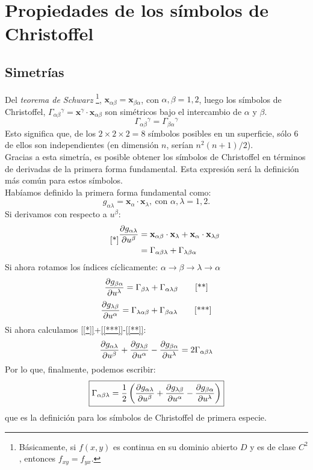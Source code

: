 \section{Propiedades de los símbolos de Christoffel}
\subsection{Simetrías}
Del \emph{teorema de Schwarz} \footnote{Básicamente, si $f(x,y)$ es continua en su dominio abierto $D$ y es de clase $C^2$, entonces $f_{xy}=f_{yx}$.}, $\mathbf{x}_{\alpha \beta }=\mathbf{x}_{\beta \alpha }$, con $\alpha ,\beta =1,2$, luego los símbolos de Christoffel, $\Gamma _{\alpha \beta }{}^\gamma =\mathbf{x}^\gamma \cdot \mathbf{x}_{\alpha \beta }$ son simétricos bajo el intercambio de $\alpha $ y $\beta $.
$$
\Gamma _{\alpha \beta }{}^\gamma =\Gamma _{\beta \alpha  }{}^\gamma 
$$
Esto significa que, de los $2\times 2\times 2=8$ símbolos posibles en un superficie, sólo 6 de ellos son independientes (en dimensión $n$, serían $n^2(n+1)/2$).\\

Gracias a esta simetría, es posible obtener los símbolos de Christoffel en términos de derivadas de la primera forma fundamental. Esta expresión será la definición más común para estos símbolos. \\

Habíamos definido la primera forma fundamental como:
$$
g_{\alpha \lambda }=\mathbf{x}_\alpha \cdot \mathbf{x}_\lambda ,\ \text{con }\alpha ,\lambda=1,2.
$$
Si derivamos con respecto a $u^\beta $:
\begin{equation} \label{[*]}\tag*{[*]}
    \begin{split}
        \pdv{g_{\alpha \lambda  }}{u^\beta }&=\mathbf{x}_{\alpha \beta }\cdot \mathbf{x}_\lambda +\mathbf{x}_\alpha \cdot \mathbf{x}_{\lambda \beta }\\
        &=\Gamma_{\alpha \beta \lambda }+\Gamma _{\lambda \beta \alpha }
    \end{split}
\end{equation}
Si ahora rotamos los índices cíclicamente: $\alpha \rightarrow \beta \rightarrow \lambda \rightarrow \alpha $
\begin{equation} \label{[**]}
    \pdv{g_{\beta \alpha }}{u^\lambda }=\Gamma _{\beta \lambda }+\Gamma _{\alpha \lambda \beta } \tag*{[**]}
\end{equation}
\begin{equation}\label{[***]}
    \pdv{g_{\lambda \beta }}{u^\alpha }=\Gamma _{\lambda \alpha \beta }+\Gamma _{\beta \alpha \lambda }\tag*{[***]}
\end{equation}
Si ahora calculamos \ref{[*]}+\ref{[***]}-\ref{[**]}:
$$
\pdv{g_{\alpha \lambda  }}{u^\beta }+\pdv{g_{\lambda \beta }}{u^\alpha }-\pdv{g_{\beta \alpha }}{u^\lambda }=2\Gamma _{\alpha \beta \lambda }
$$
Por lo que, finalmente, podemos escribir:
$$
\boxed{\Gamma _{\alpha \beta \lambda }=\frac{1}{2}\left ( \pdv{g_{\alpha \lambda  }}{u^\beta }+\pdv{g_{\lambda \beta }}{u^\alpha }-\pdv{g_{\beta \alpha }}{u^\lambda } \right )}
$$
que es la definición para los símbolos de Christoffel de primera especie. \\

